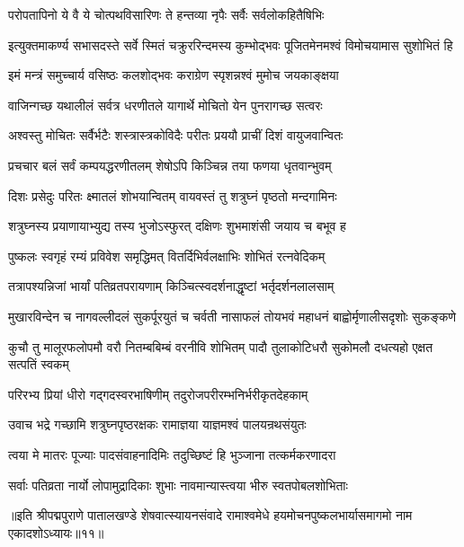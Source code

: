 \twolineshloka
{परोपतापिनो ये वै ये चोत्पथविसारिणः}
{ते हन्तव्या नृपैः सर्वैः सर्वलोकहितैषिभिः}%

\twolineshloka
{इत्युक्तमाकर्ण्य सभासदस्ते सर्वे स्मितं चक्रुररिन्दमस्य}
{कुम्भोद्भवः पूजितमेनमश्वं विमोचयामास सुशोभितं हि}%

\twolineshloka
{इमं मन्त्रं समुच्चार्य वसिष्ठः कलशोद्भवः}
{कराग्रेण स्पृशन्नश्वं मुमोच जयकाङ्क्षया}%

\twolineshloka
{वाजिन्गच्छ यथालीलं सर्वत्र धरणीतले}
{यागार्थे मोचितो येन पुनरागच्छ सत्वरः}%

\twolineshloka
{अश्वस्तु मोचितः सर्वैर्भटैः शस्त्रास्त्रकोविदैः}
{परीतः प्रययौ प्राचीं दिशं वायुजवान्वितः}%

\twolineshloka
{प्रचचार बलं सर्वं कम्पयद्धरणीतलम्}
{शेषोऽपि किञ्चिन्न तया फणया धृतवान्भुवम्}%

\twolineshloka
{दिशः प्रसेदुः परितः क्ष्मातलं शोभयान्वितम्}
{वायवस्तं तु शत्रुघ्नं पृष्ठतो मन्दगामिनः}%

\twolineshloka
{शत्रुघ्नस्य प्रयाणायाभ्युद्य तस्य भुजोऽस्फुरत्}
{दक्षिणः शुभमाशंसी जयाय च बभूव ह}%

\twolineshloka
{पुष्कलः स्वगृहं रम्यं प्रविवेश समृद्धिमत्}
{वितर्दिभिर्वलक्षाभिः शोभितं रत्नवेदिकम्}%

\twolineshloka
{तत्रापश्यन्निजां भार्यां पतिव्रतपरायणाम्}
{किञ्चित्स्वदर्शनाद्धृष्टां भर्तृदर्शनलालसाम्}%

\twolineshloka
{मुखारविन्देन च नागवल्लीदलं सुकर्पूरयुतं च चर्वती}
{नासाफलं तोयभवं महाधनं बाह्वोर्मृणालीसदृशोः सुकङ्कणे}%

\twolineshloka
{कुचौ तु मालूरफलोपमौ वरौ नितम्बबिम्बं वरनीवि शोभितम्}
{पादौ तुलाकोटिधरौ सुकोमलौ दधत्यहो एक्षत सत्पतिं स्वकम्}%

\twolineshloka
{परिरभ्य प्रियां धीरो गद्गदस्वरभाषिणीम्}
{तदुरोजपरीरम्भनिर्भरीकृतदेहकाम्}%

\twolineshloka
{उवाच भद्रे गच्छामि शत्रुघ्नपृष्ठरक्षकः}
{रामाज्ञया याज्ञमश्वं पालयन्रथसंयुतः}%

\twolineshloka
{त्वया मे मातरः पूज्याः पादसंवाहनादिमिः}
{तदुच्छिष्टं हि भुञ्जाना तत्कर्मकरणादरा}%

\twolineshloka
{सर्वाः पतिव्रता नार्यो लोपामुद्रादिकाः शुभाः}
{नावमान्यास्त्वया भीरु स्वतपोबलशोभिताः}%

॥इति श्रीपद्मपुराणे पातालखण्डे शेषवात्स्यायनसंवादे रामाश्वमेधे हयमोचनपुष्कलभार्यासमागमो नाम एकादशोऽध्यायः॥११॥



